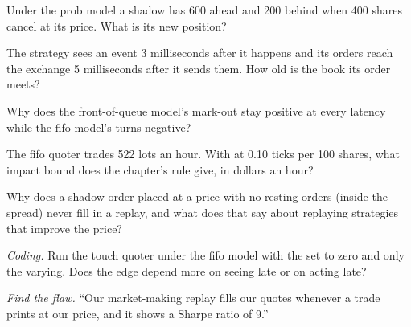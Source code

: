 \begin{exercise}[$\star$]\label{exo:rs:order-book-replay-simulation:2}
Under the prob model a shadow has 600 ahead and 200 behind when 400 shares cancel at its price. What is its new position?
\end{exercise}

\begin{exercise}[$\star$]\label{exo:rs:order-book-replay-simulation:3}
The strategy sees an event 3 milliseconds after it happens and its orders reach the exchange 5 milliseconds after it sends them. How old is the book its
order meets?
\end{exercise}

\begin{exercise}[$\star\star$]\label{exo:rs:order-book-replay-simulation:4}
Why does the front-of-queue model's mark-out stay positive at every latency while the fifo model's turns negative?
\end{exercise}

\begin{exercise}[$\star\star$]\label{exo:rs:order-book-replay-simulation:5}
The fifo quoter trades 522 lots an hour. With  at 0.10 ticks per 100 shares, what impact bound does the chapter's rule give, in dollars an hour?
\end{exercise}

\begin{exercise}[$\star\star$]\label{exo:rs:order-book-replay-simulation:6}
Why does a shadow order placed at a price with no resting orders (inside the spread) never fill in a replay, and what does that say about replaying strategies
that improve the price?
\end{exercise}

\begin{exercise}[$\star\star\star$]\label{exo:rs:order-book-replay-simulation:7}
\emph{Coding.} Run the touch quoter under the fifo model with the  set to zero and only the  varying. Does the edge
depend more on seeing late or on acting late?
\end{exercise}

\begin{exercise}[$\star\star\star$]\label{exo:rs:order-book-replay-simulation:8}
\emph{Find the flaw.} ``Our market-making replay fills our quotes whenever a trade prints at our price, and it shows a Sharpe ratio of 9.''
\end{exercise}

